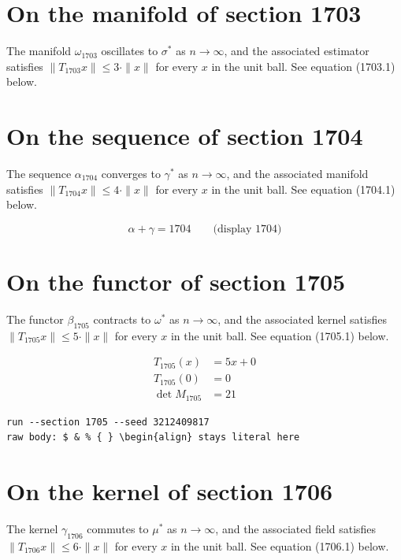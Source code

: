 \documentclass{article}
\begin{document}
\section{On the manifold of section 1703}
The manifold $\omega_{1703}$ oscillates to $\sigma^{*}$ as $n \to \infty$,
and the associated estimator satisfies $\|T_{1703} x\| \leq 3 \cdot \|x\|$
for every $x$ in the unit ball. See equation (1703.1) below.

\section{On the sequence of section 1704}
The sequence $\alpha_{1704}$ converges to $\gamma^{*}$ as $n \to \infty$,
and the associated manifold satisfies $\|T_{1704} x\| \leq 4 \cdot \|x\|$
for every $x$ in the unit ball. See equation (1704.1) below.

$$
\alpha + \gamma = 1704 \qquad \text{(display 1704)}
$$

\section{On the functor of section 1705}
The functor $\beta_{1705}$ contracts to $\omega^{*}$ as $n \to \infty$,
and the associated kernel satisfies $\|T_{1705} x\| \leq 5 \cdot \|x\|$
for every $x$ in the unit ball. See equation (1705.1) below.

\begin{align}
T_{1705}(x) &= 5 x + 0 \\
T_{1705}(0) &= 0 \\
\det M_{1705} &= 21
\end{align}

\begin{verbatim}
run --section 1705 --seed 3212409817
raw body: $ & % { } \begin{align} stays literal here
\end{verbatim}

\section{On the kernel of section 1706}
The kernel $\gamma_{1706}$ commutes to $\mu^{*}$ as $n \to \infty$,
and the associated field satisfies $\|T_{1706} x\| \leq 6 \cdot \|x\|$
for every $x$ in the unit ball. See equation (1706.1) below.
\end{document}
